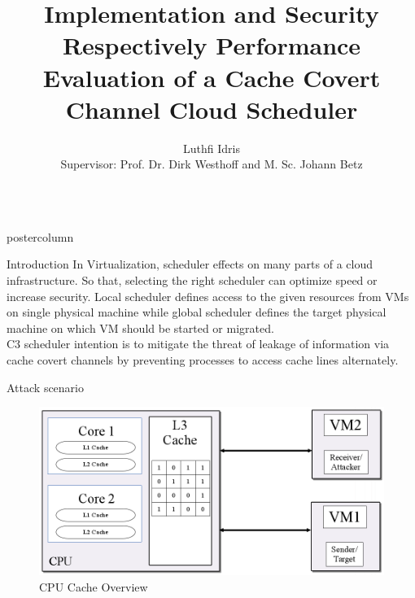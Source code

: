 \documentclass[final,hyperref={pdfpagelabels=false}]{beamer}
\title{\Huge Implementation and Security Respectively Performance Evaluation of a Cache Covert Channel Cloud Scheduler}
\author{\huge Luthfi Idris\\[0.2\baselineskip]
\Large Supervisor: Prof. Dr. Dirk Westhoff and M. Sc. Johann Betz}
\institute{University of Applied Sciences Offenburg}
\newlength{\columnheight}
\begin{document}
\begin{frame}
  \begin{columns}%
\begin{column}{.49\textwidth}
      \begin{beamercolorbox}[center,wd=\textwidth]{postercolumn}
        \begin{minipage}[T]{.95\textwidth} %
          \parbox[t][\columnheight]{\textwidth}{ %
            
\begin{block}{\Large \color{ta2skyblue} Introduction}
\Large
In Virtualization, scheduler effects on many parts of a cloud infrastructure. So that, selecting the right scheduler can optimize speed or increase security. Local scheduler defines access to the given resources from VMs on single physical machine while global scheduler defines the target physical machine on which VM should be started or migrated. 
\\

C3 scheduler intention is to mitigate the threat of leakage of information via cache covert channels by preventing processes to access cache lines alternately\cite{c1}.



\end{block}


\begin{block}{\Large \color{ta2skyblue} Attack scenario}

\begin{figure}\vspace{0.5cm}
\includegraphics[width=0.8\linewidth]{cpu_cache.png}
\caption{\large CPU Cache Overview}
\end{figure}


\end{block}}
\end{minipage}
\end{beamercolorbox}
\end{column}
\end{columns}
\end{frame}
\end{document}

